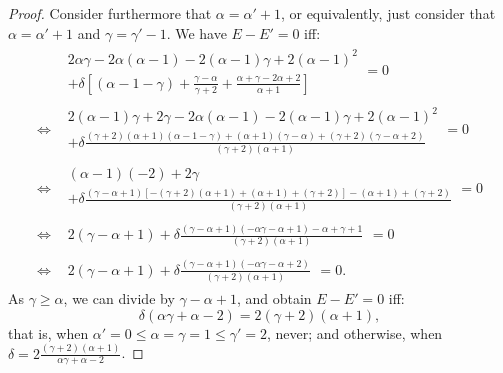 \documentclass[version=3.21, pagesize, twoside=off, bibliography=totoc, DIV=calc, fontsize=12pt, a4paper]{scrartcl}
\begin{document}
\begin{proof}
	Consider furthermore that $\alpha = \alpha' + 1$, or equivalently, just consider that $\alpha = \alpha' + 1$ and $\gamma = \gamma' - 1$. 
	We have $E - E' = 0$ iff:
	\begin{align}
		& \begin{split}
		2 \alpha \gamma - 2 \alpha (\alpha - 1) - 2 (\alpha - 1) \gamma + 2 (\alpha - 1)^2\\
			+ \delta [(\alpha - 1 - \gamma) + \frac{\gamma - \alpha}{\gamma + 2} + \frac{\alpha + \gamma - 2 \alpha + 2}{\alpha + 1}]
		\end{split} = 0\\
		⇔ & \begin{split}
		2 (\alpha - 1) \gamma + 2 \gamma - 2 \alpha (\alpha - 1) - 2 (\alpha - 1) \gamma + 2 (\alpha - 1)^2\\
			+ \delta \frac{(\gamma + 2) (\alpha + 1) (\alpha - 1 - \gamma) + (\alpha + 1) (\gamma - \alpha) + (\gamma + 2) (\gamma - \alpha + 2)}{(\gamma + 2) (\alpha + 1)}
		\end{split} = 0\\
		⇔ & \begin{split}
		(\alpha - 1) (- 2) + 2 \gamma\\
			+ \delta \frac{(\gamma - \alpha + 1) [- (\gamma + 2) (\alpha + 1) + (\alpha + 1) + (\gamma + 2)] - (\alpha + 1) + (\gamma + 2)}{(\gamma + 2) (\alpha + 1)}
		\end{split} = 0\\
		⇔ & \begin{split}
		2 (\gamma - \alpha + 1)
			+ \delta \frac{(\gamma - \alpha + 1) (- \alpha \gamma - \alpha + 1) - \alpha + \gamma + 1}{(\gamma + 2) (\alpha + 1)}
		\end{split} = 0\\
		⇔ & \begin{split}
		2 (\gamma - \alpha + 1)
			+ \delta \frac{(\gamma - \alpha + 1) (- \alpha \gamma - \alpha + 2)}{(\gamma + 2) (\alpha + 1)}
		\end{split} = 0.
	\end{align}
	As $\gamma ≥ \alpha$, we can divide by $\gamma - \alpha + 1$, and obtain $E - E' = 0$ iff:
	\begin{equation}
		\delta (\alpha \gamma + \alpha - 2) = 2 (\gamma + 2) (\alpha + 1),
	\end{equation}
	that is, when $\alpha' = 0 ≤ \alpha = \gamma = 1 ≤ \gamma' = 2$, never; and otherwise, when $\delta = 2 \frac{(\gamma + 2) (\alpha + 1)}{\alpha \gamma + \alpha - 2}$.
\end{proof}
\end{document}
